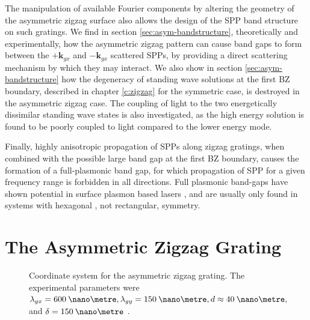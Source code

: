 The manipulation of available Fourier components by altering the geometry of the asymmetric zigzag surface also allows the design of the SPP band structure on such gratings. We find in section \ref{sec:asym-bandstructure}, theoretically and experimentally, how the asymmetric zigzag pattern can cause band gaps to form between the $+\mathbf{k}_{gx}$ and $-\mathbf{k}_{gx}$ scattered SPPs, by providing a direct scattering mechanism by which they may interact. We also show in section \ref{sec:asym-bandstructure} how the degeneracy of standing wave solutions at the first BZ boundary, described in chapter \ref{c:zigzag} for the symmetric case, is destroyed in the asymmetric zigzag case. The coupling of light to the two energetically dissimilar standing wave states is also investigated, as the high energy solution is found to be poorly coupled to light compared to the lower energy mode.

Finally, highly anisotropic propagation of SPPs along zigzag gratings, when combined with the possible large band gap at the first BZ boundary, causes the formation of a full-plasmonic band gap, for which propagation of SPP for a given frequency range is forbidden in all directions. Full plasmonic band-gaps have shown potential in surface plasmon based lasers \cite{Okamoto2004,H'Dhili2011,Okamoto2008,Berini2011}, and are usually only found in systems with hexagonal \cite{Kitson1996}, not rectangular, symmetry.

\section{The Asymmetric Zigzag Grating\label{sec:asym-about}}

\begin{figure}[h]
\begin{center}

\end{center}
\caption[Coordinate system for the asymmetric zigzag grating.]{Coordinate system for the asymmetric zigzag grating. The experimental parameters were $\lambda_{gx}=600\:\nano\metre, \lambda_{gy}=150\:\nano\metre, d\approx 40\:\nano\metre,$ and $\delta=150\:\nano\metre$ . \label{fig:asymzz-coords}}
\end{figure}


